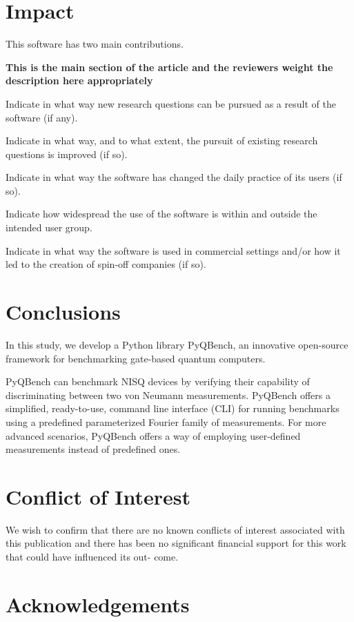 \documentclass[preprint,12pt, a4paper, dvipsnames]{elsarticle}
\newcommand{\1}{{\rm 1\hspace{-0.9mm}l}}
\theoremstyle{definition}
\begin{document}
\section{Impact}
This software has two main contributions.



\textbf{This is the main section of the article and the reviewers weight the
description here appropriately}

Indicate in what way new research questions can be pursued as a result of the
software (if any).

Indicate in what way, and to what extent, the pursuit of existing research
questions is improved (if so).

Indicate in what way the software has changed the daily practice of its users
(if so).

Indicate how widespread the use of the software is within and outside the
intended user group.

Indicate in what way the software is used in commercial settings and/or how it
led to the creation of spin-off companies (if so).

\section{Conclusions}
\label{}

In this study, we develop  a Python library PyQBench, an innovative open-source framework for benchmarking
gate-based quantum computers.


PyQBench can benchmark NISQ devices by verifying their capability of
discriminating between two von Neumann measurements. PyQBench offers a simplified, ready-to-use,
command line interface (CLI) for running benchmarks using a predefined parameterized Fourier
family of measurements. For more advanced scenarios, PyQBench offers a way of employing user-defined
measurements instead of predefined ones.
\section{Conflict of Interest}
We wish to confirm that there are no known
conflicts of interest associated with this publication and there has been no
significant financial support for this work that could have influenced its out-
come.


\section*{Acknowledgements}
\end{document}
